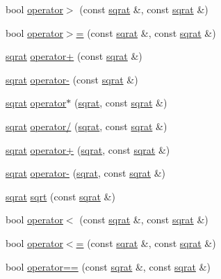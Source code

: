 \begin{DoxyCompactItemize}
bool \mbox{\hyperlink{classsqrat_a0a9ebc0afb8356e073d69a69d1450a65}{operator$>$}} (const \mbox{\hyperlink{classsqrat}{sqrat}} \&, const \mbox{\hyperlink{classsqrat}{sqrat}} \&)
\item 
bool \mbox{\hyperlink{classsqrat_adac0450048dc40c698aa22f334e280a1}{operator$>$=}} (const \mbox{\hyperlink{classsqrat}{sqrat}} \&, const \mbox{\hyperlink{classsqrat}{sqrat}} \&)
\item 
\mbox{\hyperlink{classsqrat}{sqrat}} \mbox{\hyperlink{classsqrat_a5a4ae2683cd1f23c81c09229d1dcc34a}{operator+}} (const \mbox{\hyperlink{classsqrat}{sqrat}} \&)
\item 
\mbox{\hyperlink{classsqrat}{sqrat}} \mbox{\hyperlink{classsqrat_ade89f3d4e5e8de405db9e23a1420d332}{operator-\/}} (const \mbox{\hyperlink{classsqrat}{sqrat}} \&)
\item 
\mbox{\hyperlink{classsqrat}{sqrat}} \mbox{\hyperlink{classsqrat_a0f75e7f8b43c76214b0845eadbfbfe6b}{operator$\ast$}} (\mbox{\hyperlink{classsqrat}{sqrat}}, const \mbox{\hyperlink{classsqrat}{sqrat}} \&)
\item 
\mbox{\hyperlink{classsqrat}{sqrat}} \mbox{\hyperlink{classsqrat_aa6e76248a9ec776743e60e5db8b3cb6d}{operator/}} (\mbox{\hyperlink{classsqrat}{sqrat}}, const \mbox{\hyperlink{classsqrat}{sqrat}} \&)
\item 
\mbox{\hyperlink{classsqrat}{sqrat}} \mbox{\hyperlink{classsqrat_a714592d215fdb454264df3d7bfbe0b5e}{operator+}} (\mbox{\hyperlink{classsqrat}{sqrat}}, const \mbox{\hyperlink{classsqrat}{sqrat}} \&)
\item 
\mbox{\hyperlink{classsqrat}{sqrat}} \mbox{\hyperlink{classsqrat_a78bb0ea9bd5a4282ba33a61c4bc073b6}{operator-\/}} (\mbox{\hyperlink{classsqrat}{sqrat}}, const \mbox{\hyperlink{classsqrat}{sqrat}} \&)
\item 
\mbox{\hyperlink{classsqrat}{sqrat}} \mbox{\hyperlink{classsqrat_aac93909598aa6f1b1b6bbe035a1af815}{sqrt}} (const \mbox{\hyperlink{classsqrat}{sqrat}} \&)
\item 
bool \mbox{\hyperlink{classsqrat_a1326bc7564a14f2fa4cbe59cdcf94b69}{operator$<$}} (const \mbox{\hyperlink{classsqrat}{sqrat}} \&, const \mbox{\hyperlink{classsqrat}{sqrat}} \&)
\item 
bool \mbox{\hyperlink{classsqrat_ae33aee8490a3137fb967fbd52b100f6d}{operator$<$=}} (const \mbox{\hyperlink{classsqrat}{sqrat}} \&, const \mbox{\hyperlink{classsqrat}{sqrat}} \&)
\item 
bool \mbox{\hyperlink{classsqrat_aa31a4a7298644b244db89e455265c946}{operator==}} (const \mbox{\hyperlink{classsqrat}{sqrat}} \&, const \mbox{\hyperlink{classsqrat}{sqrat}} \&)

\end{DoxyCompactItemize}
